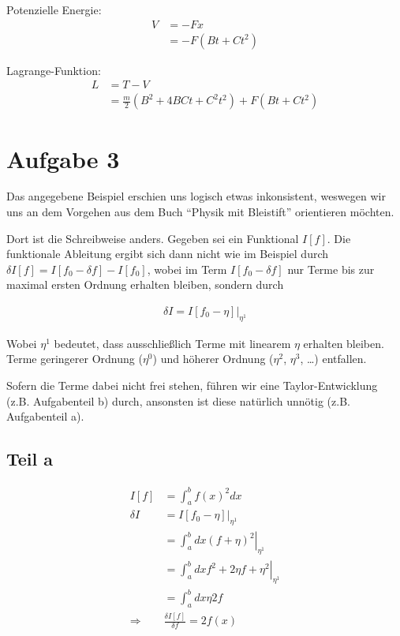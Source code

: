 \documentclass[a4paper,german,12pt,smallheadings]{scrartcl}
\begin{document}
Potenzielle Energie:
\begin{align*}
  V &= -Fx \\
    &= -F(Bt+Ct^2)
\end{align*}

Lagrange-Funktion:
\begin{align*}
  L &= T - V \\
    &= \frac{m}{2} (B^2 + 4BCt + C^2t^2) + F(Bt+Ct^2)
\end{align*}

\section*{Aufgabe 3}
Das angegebene Beispiel erschien uns logisch etwas inkonsistent, weswegen wir
uns an dem Vorgehen aus dem Buch ``Physik mit Bleistift'' orientieren möchten.

Dort ist die Schreibweise anders. Gegeben sei ein Funktional $I[f]$. Die
funktionale Ableitung ergibt sich dann nicht wie im Beispiel durch $\delta I[f]
= I[f_0 - \delta f] - I[f_0]$, wobei im Term $I[f_0 - \delta f]$ nur Terme bis
zur maximal ersten Ordnung erhalten bleiben, sondern durch

\begin{align*}
  \delta I = \left.I[f_0 - \eta]\right|_{\eta^1}
\end{align*}

Wobei $\eta^1$ bedeutet, dass ausschließlich Terme mit linearem $\eta$ erhalten
bleiben. Terme geringerer Ordnung ($\eta^0$) und höherer Ordnung ($\eta^2$,
$\eta^3$, \dots) entfallen.

Sofern die Terme dabei nicht frei stehen, führen wir eine Taylor-Entwicklung
(z.B. Aufgabenteil b) durch, ansonsten ist diese natürlich unnötig (z.B.
Aufgabenteil a).

\subsection*{Teil a}

\begin{align*}
  I[f] &= \int_a^b f(x)^2 dx \\
  \delta I &= \left.I[f_0 - \eta]\right|_{\eta^1} \\
  &=\left.\int_a^b dx (f+\eta)^2 \right|_{\eta^1} \\
  &=\left.\int_a^b dx f^2 + 2 \eta f + \eta^2 \right|_{\eta^1} \\
  &=\int_a^b dx \eta 2 f \\
  \Rightarrow& \frac{\delta I[f]}{\delta f} = 2f(x)
\end{align*}
\end{document}

